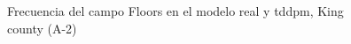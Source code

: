 \begin{figure}[H]
    \centering
    
    \caption{Frecuencia del campo Floors en el modelo real y tddpm, King county (A-2)}
    \label{frecuency-tddpm-floors}
\end{figure}